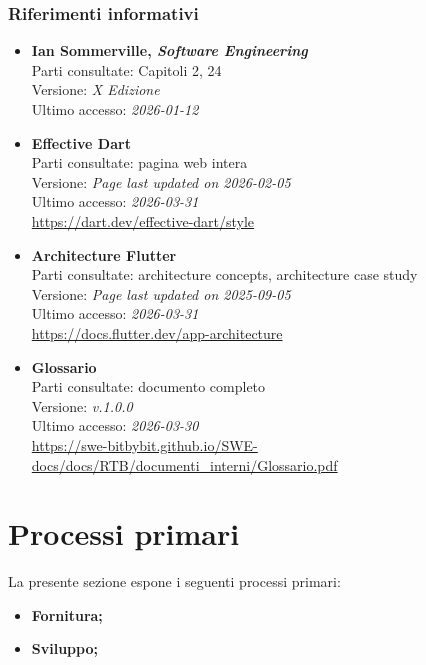 \documentclass[a4paper,12pt]{article}
\begin{document}
\subsubsection{Riferimenti informativi}
\begin{itemize}\raggedright
    \item \textbf{Ian Sommerville, \emph{Software Engineering}}\\
    Parti consultate: Capitoli 2, 24\\
    Versione: \textit{X Edizione}\\
    Ultimo accesso: \textit{2026-01-12}\\
    \item \textbf{Effective Dart}\\
        Parti consultate: pagina web intera\\
        Versione: \textit{Page last updated on 2026-02-05}\\
        Ultimo accesso: \textit{2026-03-31}\\
        \url{https://dart.dev/effective-dart/style}
    \item \textbf{Architecture Flutter}\\
        Parti consultate: architecture concepts, architecture case study\\
        Versione: \textit{Page last updated on 2025-09-05}\\
        Ultimo accesso: \textit{2026-03-31}\\
        \url{https://docs.flutter.dev/app-architecture}
    \item \textbf{Glossario}\\
        Parti consultate: documento completo\\
        Versione: \textit{v.1.0.0}\\
        Ultimo accesso: \textit{2026-03-30}\\
        \url{https://swe-bitbybit.github.io/SWE-docs/docs/RTB/documenti_interni/Glossario.pdf}
\end{itemize}

\section{Processi primari}
La presente sezione espone i seguenti processi primari:
\begin{itemize}
    \item[(a)] \textbf{Fornitura;}
    \item[(b)] \textbf{Sviluppo;}
\end{itemize}
\end{document}
